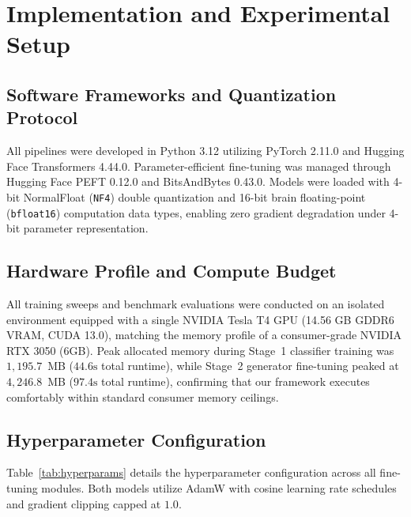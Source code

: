 \documentclass{ieeeaccess}
\begin{document}
\section{Implementation and Experimental Setup}
\label{sec:implementation}

\subsection{Software Frameworks and Quantization Protocol}
All pipelines were developed in Python 3.12 utilizing PyTorch 2.11.0 and Hugging Face Transformers 4.44.0. Parameter-efficient fine-tuning was managed through Hugging Face PEFT 0.12.0 and BitsAndBytes 0.43.0. Models were loaded with 4-bit NormalFloat (\texttt{NF4}) double quantization and 16-bit brain floating-point (\texttt{bfloat16}) computation data types, enabling zero gradient degradation under 4-bit parameter representation.

\subsection{Hardware Profile and Compute Budget}
All training sweeps and benchmark evaluations were conducted on an isolated environment equipped with a single NVIDIA Tesla T4 GPU (14.56 GB GDDR6 VRAM, CUDA 13.0), matching the memory profile of a consumer-grade NVIDIA RTX 3050 (6GB). Peak allocated memory during Stage~1 classifier training was $1,195.7$~MB ($44.6\text{s}$ total runtime), while Stage~2 generator fine-tuning peaked at $4,246.8$~MB ($97.4\text{s}$ total runtime), confirming that our framework executes comfortably within standard consumer memory ceilings.

\subsection{Hyperparameter Configuration}
Table~\ref{tab:hyperparams} details the hyperparameter configuration across all fine-tuning modules. Both models utilize AdamW with cosine learning rate schedules and gradient clipping capped at $1.0$.
\end{document}
